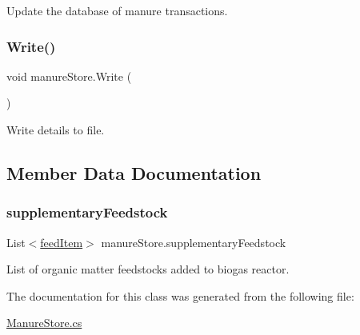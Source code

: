 Update the database of manure transactions. 

\mbox{\label{classmanure_store_a78539590211c7a2a278df92b41bbd1d0}} 
\subsubsection{\texorpdfstring{Write()}{Write()}}
{\footnotesize\ttfamily void manure\+Store.\+Write (\begin{DoxyParamCaption}{ }\end{DoxyParamCaption})\hspace{0.3cm}{\ttfamily [inline]}}



Write details to file. 



\subsection{Member Data Documentation}
\mbox{\label{classmanure_store_a850d2cd27fa7400a7ab9fcda1272f79f}} 
\subsubsection{\texorpdfstring{supplementaryFeedstock}{supplementaryFeedstock}}
{\footnotesize\ttfamily List$<$\mbox{\hyperlink{classfeed_item}{feed\+Item}}$>$ manure\+Store.\+supplementary\+Feedstock}



List of organic matter feedstocks added to biogas reactor. 



The documentation for this class was generated from the following file\+:\begin{DoxyCompactItemize}
\item 
\mbox{\hyperlink{_manure_store_8cs}{Manure\+Store.\+cs}}\end{DoxyCompactItemize}
